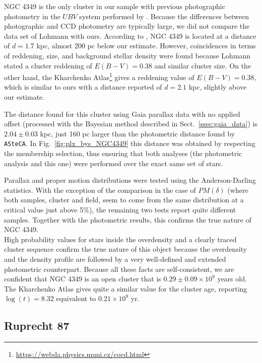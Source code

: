 \documentclass[draft]{aa}
\begin{document}
NGC 4349 is the only cluster in our sample with previous photographic photometry
in the $UBV$ system performed by \cite{Lohmann_1961}. Because the
differences between photographic and CCD photometry are typically large, we did not compare the data set of Lohmann with ours. According to \cite{Lohmann_1961}, NGC
4349 is located at a distance of $d=1.7$ kpc, almost 200 pc below our estimate.
However, coincidences in terms of reddening, size, and background stellar density
were found because Lohmann stated a cluster reddening of $E(B-V)=0.38$
and similar cluster size. On the other hand, the Kharchenko
Atlas\footnote{\url{https://webda.physics.muni.cz/cocd.html}}
\citep{Kharchenko_2005} gives a reddening value of $E(B-V)=0.38,$ which is
similar to ours with a distance reported of $d=2.1$ kpc, slightly
above our estimate.

The distance found for this cluster using Gaia parallax data with no applied
offset (processed with the Bayesian method described in
Sect.~\ref{ssec:gaia_data}) is $2.04\pm0.03$ kpc, just 160 pc
larger than the photometric distance found by \texttt{ASteCA}.
In Fig.~\ref{fig:plx_bys_NGC4349}  this distance was obtained
by respecting the membership selection, thus ensuring that both analyses 
(the photometric analysis and this one) were performed over the exact same set
of stars.

Parallax and proper motion distributions were tested using the Anderson-Darling
statistics. With the exception of the comparison in the case of $PM(\delta)$
(where both samples, cluster and field, seem to come from the same distribution
at a critical value just above 5\%), the remaining two tests report quite
different samples. Together with the photometric results, this confirms the true
nature of NGC 4349.\\

High probability values for stars inside the overdensity and a clearly traced
cluster sequence confirm the true nature of this object because the overdensity
and the density profile are followed by a very well-defined and extended
photometric counterpart.
Because all these facts are self-consistent, we are confident that NGC 4349 is
an open cluster that is $0.29\pm0.09\times10^9$ years old.
The Kharchenko Atlas gives quite a similar value for the cluster age, reporting
$\log(t)=8.32$ equivalent to $0.21\times10^9$ yr.




\subsection{Ruprecht 87}
\end{document}
